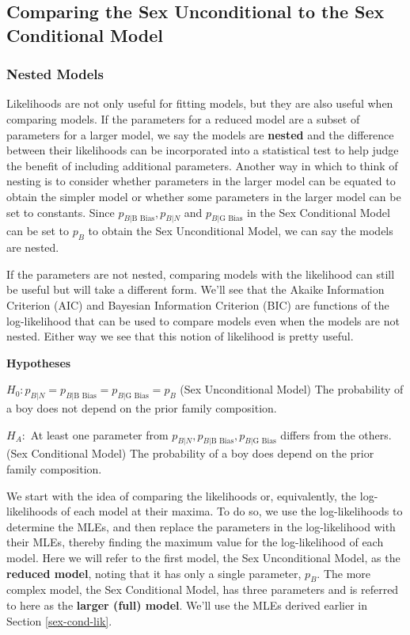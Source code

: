\documentclass[
]{krantz}
\newcommand{\neutral}{p_{B|N}}
\newcommand{\gbias}{p_{B|\textrm{G Bias}}}
\newcommand{\bbias}{p_{B|\textrm{B Bias}}}
\begin{document}
\hypertarget{sec-lrtest}{%
\subsection{Comparing the Sex Unconditional to the Sex Conditional Model}\label{sec-lrtest}}

\hypertarget{nested-models}{%
\subsubsection{Nested Models}\label{nested-models}}

Likelihoods are not only useful for fitting models, but they are also useful when comparing models. If the parameters for a reduced model are a subset of parameters for a larger model, we say the models are \textbf{nested}  and the difference between their likelihoods can be incorporated into a statistical test to help judge the benefit of including additional parameters. Another way in which to think of nesting is to consider whether parameters in the larger model can be equated to obtain the simpler model or whether some parameters in the larger model can be set to constants. Since \(\bbias, \neutral\) and \(\gbias\) in the Sex Conditional Model can be set to \(p_B\) to obtain the Sex Unconditional Model, we can say the models are nested.

If the parameters are not nested, comparing models with the likelihood can still be useful but will take a different form. We'll see that the Akaike Information Criterion (AIC) and Bayesian Information Criterion (BIC) are functions of the log-likelihood that can be used to compare models even when the models are not nested. Either way we see that this notion of likelihood is pretty useful.

\textbf{Hypotheses}

\(H_0: \neutral=\bbias=\gbias=p_B\) (Sex Unconditional Model)
The probability of a boy does not depend on the prior family composition.

\(H_A:\) At least one parameter from \(\neutral, \bbias,\gbias\) differs from the others. (Sex Conditional Model)
The probability of a boy does depend on the prior family composition.

We start with the idea of comparing the likelihoods or, equivalently, the log-likelihoods of each model at their maxima. To do so, we use the log-likelihoods to determine the MLEs, and then replace the parameters in the log-likelihood with their MLEs, thereby finding the maximum value for the log-likelihood of each model. Here we will refer to the first model, the Sex Unconditional Model, as the \textbf{reduced model},  noting that it has only a single parameter, \(p_B\). The more complex model, the Sex Conditional Model, has three parameters and is referred to here as the \textbf{larger (full) model}. We'll use the MLEs derived earlier in Section \ref{sex-cond-lik}.
\end{document}
